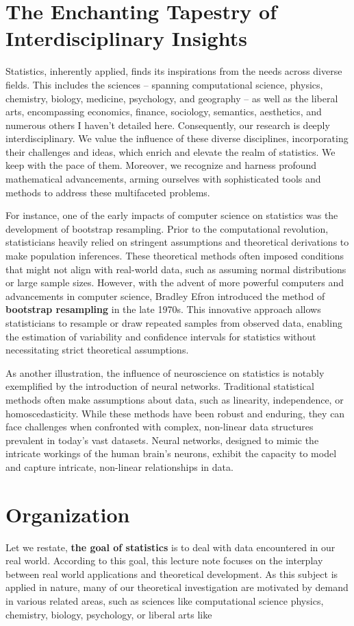 \documentclass{book}
\begin{document}
\section{The Enchanting Tapestry of Interdisciplinary Insights}
Statistics, inherently applied, finds its inspirations from the needs across diverse fields.  
This includes the sciences -- spanning computational science, physics, chemistry, biology, medicine, psychology, and geography -- as well as the liberal arts, encompassing economics, finance, sociology, semantics, aesthetics, and numerous others I haven't detailed here. 
Consequently, our research is deeply interdisciplinary. We value the influence of these diverse disciplines, incorporating their challenges and ideas, which enrich and elevate the realm of statistics. 
We keep with the pace of them.
Moreover, we recognize and harness profound mathematical advancements, arming ourselves with sophisticated tools and methods to address these multifaceted problems.

For instance, one of the early impacts of computer science on statistics was the development of bootstrap resampling. 
Prior to the computational revolution, statisticians heavily relied on stringent assumptions and theoretical derivations to make population inferences. 
These theoretical methods often imposed conditions that might not align with real-world data, such as assuming normal distributions or large sample sizes. 
However, with the advent of more powerful computers and advancements in computer science, Bradley Efron introduced the method of \textbf{bootstrap resampling} in the late 1970s. 
This innovative approach allows statisticians to resample or draw repeated samples from observed data, enabling the estimation of variability and confidence intervals for statistics without necessitating strict theoretical assumptions.

As another illustration, the influence of neuroscience on statistics is notably exemplified by the introduction of neural networks. 
Traditional statistical methods often make assumptions about data, such as linearity, independence, or homoscedasticity. 
While these methods have been robust and enduring, they can face challenges when confronted with complex, non-linear data structures prevalent in today's vast datasets. 
Neural networks, designed to mimic the intricate workings of the human brain's neurons, exhibit the capacity to model and capture intricate, non-linear relationships in data.


\section{Organization}
Let we restate, \textbf{the goal of statistics} is to deal with data encountered in our real world.
According to this goal, this lecture note focuses on the interplay between real world applications and theoretical development.
As this subject is applied in nature, many of our theoretical investigation are motivated by demand in various related areas,
such as sciences like computational science physics, chemistry, biology, psychology, or liberal arts like 
\end{document}
